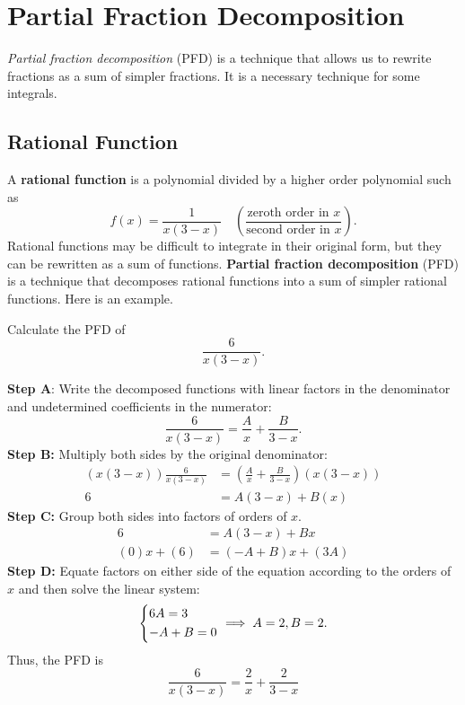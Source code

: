 \documentclass[10pt,letterpaper]{article}
\begin{document}
\section{Partial Fraction Decomposition}
\textit{Partial fraction decomposition} (PFD) is a technique that allows us to rewrite fractions as a sum of simpler fractions. It is a necessary technique for some integrals.

\subsection{Rational Function} 
A \textbf{rational function} is a polynomial divided by a higher order polynomial such as 
$$
f(x)=\frac{1}{x(3-x)} \quad \left(\frac{\text{zeroth order in } x}{\text{second order in }x}\right). 
$$
Rational functions may be difficult to integrate in their original form, but they can be rewritten as a sum of functions. \textbf{Partial fraction decomposition} (PFD) is a technique that decomposes rational functions into a sum of simpler rational functions. Here is an example.


\begin{example}[4]{

Calculate the PFD of 
$$
\frac{6}{x(3-x)}.
$$
}

\textbf{Step A}: Write the decomposed functions with linear factors in the denominator and undetermined coefficients in the numerator: 
$$
\frac{6}{x(3-x)} = \frac{A}{x} + \frac{B}{3-x}.
$$
\textbf{Step B:} Multiply both sides by the original denominator: 
\begin{align*}
    (x(3-x))\frac{6}{x(3-x)} &= \left(\frac{A}{x} + \frac{B}{3-x}\right) (x(3-x))\\
    6 &= A(3-x) + B(x)
\end{align*}
\textbf{Step C:} Group both sides into factors of orders of $x$.
\begin{align*}
    6 &= A(3-x) + Bx\\
    (0)x + (6) &=  (-A+B)x + (3A)
\end{align*}
\textbf{Step D:} Equate factors on either side of the equation according to the orders of $x$ and then solve the linear system:
$$
\begin{dcases}
    6A=3\\
    -A+B=0\\
\end{dcases} \implies  A=2, B=2.
$$
Thus, the PFD is 
$$
\boxed{
\frac{6}{x(3-x)} = \frac{2}{x} + \frac{2}{3-x}
}
$$
\end{example}
\end{document}
